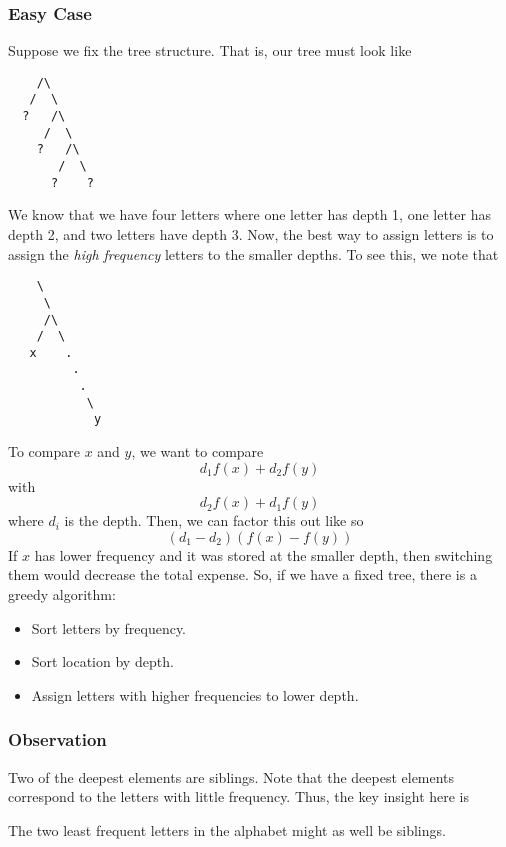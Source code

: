 \documentclass[letterpaper]{article}
\begin{document}
\subsubsection{Easy Case}
Suppose we fix the tree structure. That is, our tree must look like 
\begin{verbatim}
    /\
   /  \ 
  ?   /\ 
     /  \ 
    ?   /\ 
       /  \ 
      ?    ?
\end{verbatim} 
We know that we have four letters where one letter has depth 1, one letter has depth 2, and two letters have depth 3. Now, the best way to assign letters is to assign the \emph{high frequency} letters to the smaller depths. To see this, we note that 
\begin{verbatim}
    \ 
     \ 
     /\ 
    /  \
   x    . 
         . 
          . 
           \ 
            y 
\end{verbatim}
To compare $x$ and $y$, we want to compare
\[d_1 f(x) + d_2 f(y)\]
with 
\[d_2 f(x) + d_1 f(y)\]
where $d_i$ is the depth. Then, we can factor this out like so 
\[(d_1 - d_2)(f(x) - f(y))\]
If $x$ has lower frequency and it was stored at the smaller depth, then switching them would decrease the total expense. So, if we have a fixed tree, there is a greedy algorithm:
\begin{itemize}
    \item Sort letters by frequency. 
    \item Sort location by depth. 
    \item Assign letters with higher frequencies to lower depth.
\end{itemize}

\subsubsection{Observation}
Two of the deepest elements are siblings. Note that the deepest elements correspond to the letters with little frequency. Thus, the key insight here is 
\begin{mdframed}[]
    The two least frequent letters in the alphabet might as well be siblings. 
\end{mdframed}
\end{document}

